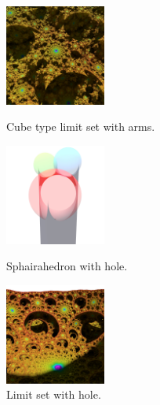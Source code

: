 \documentclass[suppldata, dvipdfmx]{interact}
\theoremstyle{plain}%
\theoremstyle{definition}
\theoremstyle{remark}
\theoremstyle{problemstyle}
\begin{document}
\begin{figure}[H]
 \begin{minipage}[t]{0.3\textwidth}
  \centering
  \includegraphics[width=1.3in, keepaspectratio]{./img/visualization/cubeArms.jpg}
 \caption{Cube type limit set with arms.}
 \label{fig:cubeArms}
 \end{minipage}
 \hspace*{\fill}
 \begin{minipage}[t]{0.3\textwidth}
  \centering
  \includegraphics[width=1.3in,
  keepaspectratio]{./img/visualization/lowerHalfSphairahedron.jpg}
 \caption{Sphairahedron with hole.}
 \label{fig:lowerPrism}
 \end{minipage}
 \hspace*{\fill}
 \begin{minipage}[t]{0.3\textwidth}
  \centering
  \includegraphics[width=1.3in,
  keepaspectratio]{./img/visualization/lowerHalfLimit.jpg}
 \caption{Limit set with hole.}
 \label{fig:lowerLimit}
 \end{minipage}
 \hspace*{\fill}
\end{figure}
\end{document}
